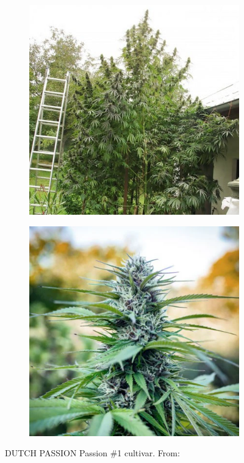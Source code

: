 \begin{figure}[htbp]
    \begin{subfigure}[t]{.48\textwidth}
        \includegraphics[width=\linewidth]{DUTCH-PASSION_Passion-No1_1}
        \label{fig:cannabis_passion-no1_1}
    \end{subfigure}
    \begin{subfigure}[t]{.48\textwidth}
        \includegraphics[width=\linewidth]{DUTCH-PASSION_Passion-No1_2}
        \label{fig:cannabis_passion-no1_2}
    \end{subfigure}
    \caption[DUTCH PASSION Passion \#1]{DUTCH PASSION Passion \#1 cultivar. From: }
    \label{fig:cannabis_passion-no1}
\end{figure}

